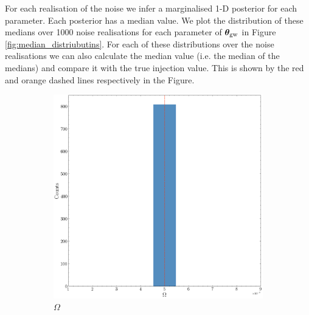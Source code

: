 \documentclass[fleqn,usenatbib,useAMS]{mnras}
\begin{document}
For each realisation of the noise we infer a marginalised 1-D posterior for each parameter. Each posterior has a median value. We plot the distribution of these medians over 1000 noise realisations for each parameter of $\boldsymbol{\theta}_{\rm gw}$ in Figure \ref{fig:median_distriubutins}. For each of these distributions over the noise realisations we can also calculate the median value (i.e. the median of the medians) and compare it with the true injection value. This is shown by the red and orange dashed lines respectively in the Figure.
\begin{figure}
	
	\begin{subfigure}[b]{0.3\textwidth}
		\includegraphics[width=\textwidth]{images/distribution_omega_gw}
		\caption{$\Omega$}
	\end{subfigure}
	\hfill
	\begin{subfigure}[b]{0.3\textwidth}

\end{subfigure}
\end{figure}
\end{document}
